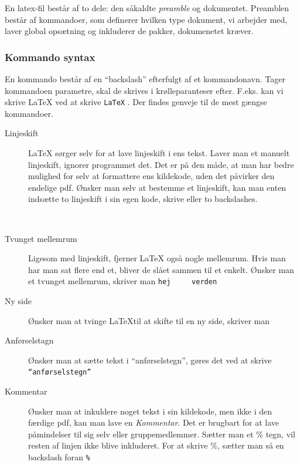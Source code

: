 \documentclass{article}
\newcommand{\tex}[1] {
  \texttt{#1}
}
\begin{document}
En latex-fil består af to dele: den såkaldte \emph{preamble} og dokumentet.
Preamblen består af kommandoer, som definerer hvilken type dokument, vi
arbejder med, laver global opsætning og inkluderer de pakker, dokumenetet
kræver.

\subsubsection{Kommando syntax}
En kommando består af en ``backslash'' efterfulgt af et kommandonavn.
Tager kommandoen parametre, skal de skrives i krølleparanteser
efter. F.eks. kan vi skrive \LaTeX{} ved at skrive \tex{\LaTeX}. Der findes
genveje til de mest gængse kommandoer.
\begin{description}
	\item[Linjeskift] \LaTeX{} sørger selv for at lave linjeskift i ens tekst.
	      Laver man et manuelt linjeskift, ignorer programmet det. Det er på den måde, at man har
	      bedre mulighed for selv at formattere ens kildekode, uden det påvirker den
	      endelige pdf. Ønsker man selv at bestemme et linjeskift, kan man enten indsætte to
	      linjeskift i sin egen kode, skrive \tex{\linebreak} eller to backslashes.
	      \tex{\\}

	\item[Tvunget mellemrum] Ligesom med linjeskift, fjerner \LaTeX{} også
	      nogle mellemrum. Hvis man har man sat flere end et, bliver de slået sammen til et enkelt.
	      Ønsker man et tvunget mellemrum, skriver man \tex{hej ~~~ verden}

	\item[Ny side] Ønsker man at tvinge \LaTeX til at skifte til en ny side,
	      skriver man \tex{\newpage}

	\item[Anførselstagn] Ønsker man at sætte tekst i ``anførselstegn'', gøres
	      det ved at skrive \tex{``anførselstegn''}

	\item[Kommentar] Ønsker man at inkuldere noget tekst i sin kildekode, men
	      ikke i den færdige pdf, kan man lave en \emph{Kommentar}. Det er brugbart
	      for at lave påmindelser til sig selv eller gruppemedlemmer. Sætter man
	      et \(\%\) tegn, vil resten af linjen ikke blive inkluderet. For at
	      skrive \(\%\), sætter man så en backslash foran \tex{\%}



\end{description}
\end{document}
